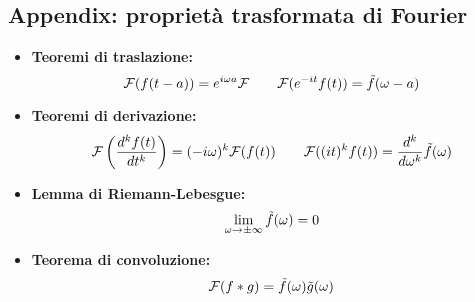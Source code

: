 \documentclass[twoside]{article}
\begin{document}
\subsection{Appendix: proprietà trasformata di Fourier}
\begin{itemize}
    \item \textbf{Teoremi di traslazione:}
    \begin{equation}
        \mathcal{F}(f(t-a))=e^{i\omega a}\mathcal{F} \qquad \mathcal{F}(e^{-it}f(t))=\Tilde{f}(\omega-a)
    \end{equation}
    \item \textbf{Teoremi di derivazione:}
    \begin{equation}
        \mathcal{F}\left(\frac{d^kf(t)}{dt^k}\right)=(-i\omega)^k\mathcal{F}(f(t)) \qquad \mathcal{F}((it)^kf(t))=\frac{d^k}{d\omega^k}\Tilde{f}(\omega)
    \end{equation}
    \item \textbf{Lemma di Riemann-Lebesgue:}
    \begin{equation}
        \lim_{\omega\to\pm\infty}\Tilde{f}(\omega)=0
    \end{equation}
    \item \textbf{Teorema di convoluzione:}
    \begin{equation}
        \mathcal{F}(f*g)=\Tilde{f}(\omega)\Tilde{g}(\omega)
    \end{equation}
\end{itemize}






\begin{comment}
\newpage
buonasera\\
sto cercando supporto morale\\
vedo che hai degli errori con hyperref\\
poi te li sistemo\\
<3\\
TUtto quello che ho fatto stasera è la lezione 11 e riscrivere 6 volte le stesse 2 frasi di Lab\\
tutto quello che ho fatto io è stato aspettare che finiscano le acquisizioni big mood\\
Comunque stiamo costruendo una sedia di quelle ergonomiche\\
?\\
che vuol dire ergonomiche?\\
Quelle con il poggiaginocchia e senza schienale, in modo da stare con la schiena dritta\\
che scomode oddio le avevo provate all'ikea\\
c'è da dire che si fanno bene però ti ci devi abituare e all'inizio a me ha dato noia\\
Eh lo so, ma se no divento il gobbo di notre dame\\
Buonanotte giuliè\\
vado anche io\\
buonanotte\\
\end{comment}
\newpage
\end{document}
